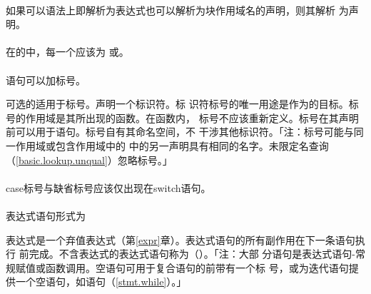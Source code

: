 \paragraph{}
如果可以语法上即解析为表达式也可以解析为块作用域名的声明，则其解析
为声明。

\paragraph{}
在的中，每一个应该为
或。

\paragraph{}
语句可以加标号。


可选的适用于标号。声明一个标识符。标
识符标号的唯一用途是作为的目标。标号的作用域是其所出现的函数。在函数内，
标号不应该重新定义。标号在其声明前可以用于语句。标号自有其命名空间，不
干涉其他标识符。「注：标号可能与同一作用域或包含作用域中的
中的另一声明具有相同的名字。未限定名查询（\ref{basic.lookup.unqual}）忽略标号。」

\paragraph{}
case标号与缺省标号应该仅出现在switch语句。

\paragraph{}
表达式语句形式为


表达式是一个弃值表达式（第\ref{expr}章）。表达式语句的所有副作用在下一条语句执行
前完成。不含表达式的表达式语句称为（）。「注：大部
分语句是表达式语句-常规赋值或函数调用。空语句可用于复合语句的\tm{\}}前带有一个标
号，或为迭代语句提供一个空语句，如语句（\ref{stmt.while}）。」

